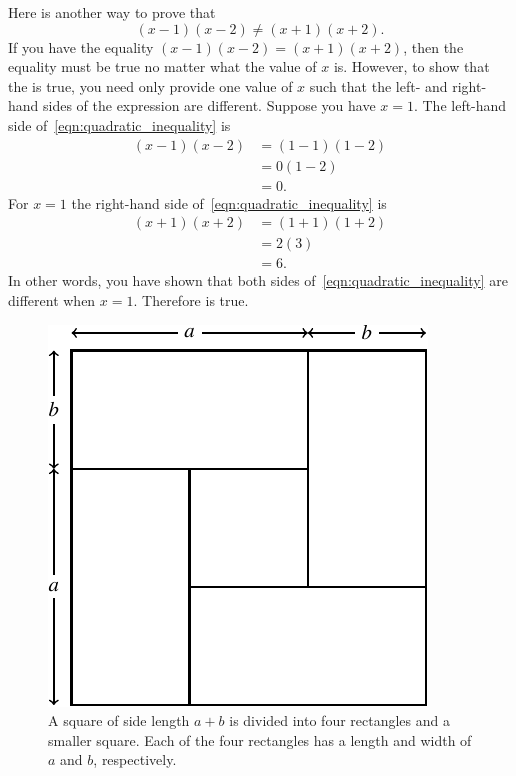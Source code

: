 \documentclass[a4paper,oneside,12pt]{article}
\begin{document}
\begin{problem}
{\begin{solution}
Here is another way to prove that
\begin{equation}
\label{eqn:quadratic_inequality}
(x - 1)(x - 2)
\neq
(x + 1)(x + 2).
\end{equation}
If you have the equality $(x - 1)(x - 2) = (x + 1)(x + 2)$, then the
equality must be true no matter what the value of $x$ is.  However, to
show that the  is true, you need
only provide one value of $x$ such that the left- and right-hand sides
of the expression are different.  Suppose you have $x = 1$.  The
left-hand side of~\eqref{eqn:quadratic_inequality} is
\begin{align*}
(x - 1)(x - 2)
&=
(1 - 1)(1 - 2) \\[4pt]
&=
0(1 - 2) \\[4pt]
&=
0.
\end{align*}
For $x = 1$ the right-hand side of~\eqref{eqn:quadratic_inequality} is
\begin{align*}
(x + 1)(x + 2)
&=
(1 + 1)(1 + 2) \\[4pt]
&=
2(3) \\[4pt]
&=
6.
\end{align*}
In other words, you have shown that both sides
of~\eqref{eqn:quadratic_inequality} are different when $x = 1$.
Therefore  is true.
\end{solution}
}{}

\begin{figure}[!htbp]
\centering
\includegraphics[scale=1.2]{image/08/arithmetic-geometric-inequality.pdf}
\caption{%
  A square of side length $a + b$ is divided into four rectangles and
  a smaller square.  Each of the four rectangles has a length and
  width of $a$ and $b$, respectively.
}
\label{fig:arithmetic_mean_geometric_mean_inequality}
\end{figure}


\end{problem}
\end{document}
